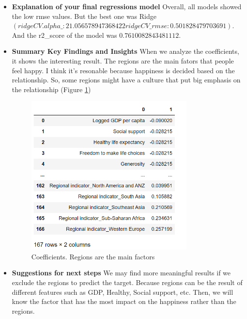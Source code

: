 \documentclass[12pt]{article}
\begin{document}
\begin{itemize}
\item \textbf{Explanation of your final regressions model}
Overall, all models showed the low rmse values. But the best one was Ridge $(ridgeCV.alpha\_ :  21.056578947368422  ridgeCV\_rmse:  0.501828479703691)$. And the r2\_score of the model was $0.7610082843481112$.

\item \textbf{Summary Key Findings and Insights}
When we analyze the coefficients, it shows the interesting result. The regions are the main fators that people feel happy. I think it's resonable because happiness is decided based on the relationship. So, some regions might have a culture that put big emphasis on the relationship (Figure \ref{factors})

\begin{figure}[hbt!]
    \centering
    \includegraphics[width=0.8\textwidth]{figures/factors.png}
    \caption{Coefficients. Regions are the main factors}\label{factors}
\end{figure}

\item \textbf{Suggestions for next steps}
We may find more meaningful results if we exclude the regions to predict the target. Because regions can be the result of different features such as GDP, Healthy, Social support, etc. Then, we will know the factor that has the most impact on the happiness rather than the regions.

\end{itemize}
\end{document}
